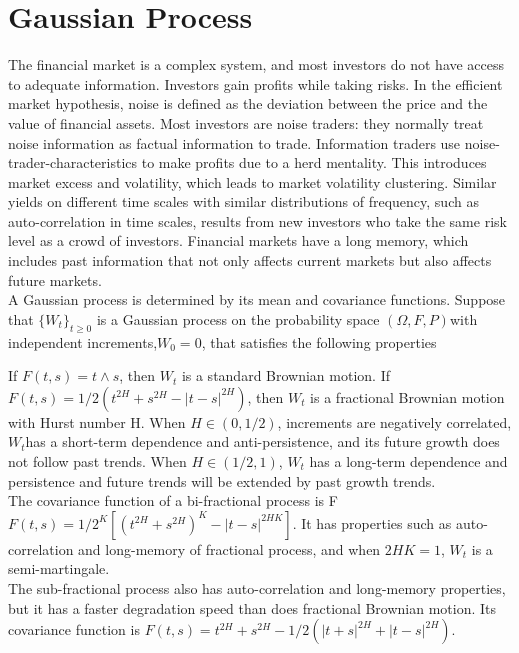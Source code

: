 \documentclass{ctexart} %
\begin{document}
\section{Gaussian Process}
The financial market is a complex system, and most investors do not have access to adequate information. Investors gain profits while taking risks. In the efficient market hypothesis, noise is defined as the deviation between the price and the value of financial assets. Most investors are noise traders: they normally treat noise information as factual information to trade. Information traders use noise-trader-characteristics to make profits due to a herd mentality. This introduces market excess and volatility, which leads to market volatility clustering. Similar yields on different time scales with similar distributions of frequency, such as auto-correlation in time scales, results from new investors who take the same risk level as a crowd of investors. Financial markets have a long memory, which includes past information that not only affects current markets but also affects future markets.\\

A Gaussian process is determined by its mean and covariance functions. Suppose that $\{W_t\}_{t\geq 0}$ is a Gaussian process on the probability space $(\Omega,F,P)$with independent increments,$W_0=0$, that satisfies the following properties

If $F(t,s)=t\wedge s$, then $W_t$ is a standard Brownian motion. If $F(t,s)=1/2(t^{2H}+s^{2H}-|t-s|^{2H})$, then $W_t$  is a fractional Brownian motion with Hurst number H. When $H\in(0,1/2)$, increments are negatively correlated, $W_t$has a short-term dependence and anti-persistence, and its future growth does not follow past trends. When $H\in(1/2,1)$, $W_t$  has a long-term dependence and persistence and future trends will be extended by past growth trends.\\

The covariance function of a bi-fractional process is F$F(t,s)=1/2^K[(t^{2H}+s^{2H})^K-|t-s|^{2HK}]$. It has properties such as auto-correlation and long-memory of fractional process, and when $2HK=1$, $W_t$ is a semi-martingale.\\
The sub-fractional process also has auto-correlation and long-memory properties, but it has a faster degradation speed than does fractional Brownian motion. Its covariance function is $F(t,s)=t^{2H}+s^{2H}-1/2(|t+s|^{2H}+|t-s|^{2H})$.\\
\end{document}
